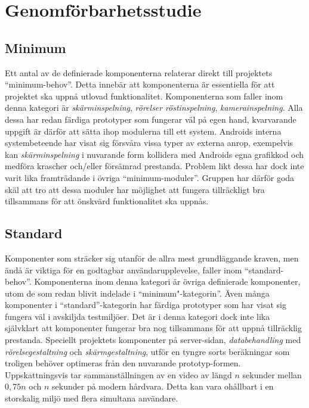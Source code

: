 \section{Genomförbarhetsstudie}

\subsection{Minimum} %
\label{sub:Minimum}

Ett antal av de definierade komponenterna relaterar direkt till projektets ``minimum-behov''. Detta innebär att komponenterna är essentiella för att projektet ska uppnå utlovad funktionalitet. Komponenterna som faller inom denna kategori är \textit{skärminspelning}, \textit{rörelser} \textit{röstinspelning}, \textit{kamerainspelning}. Alla dessa har redan färdiga prototyper som fungerar väl på egen hand, kvarvarande uppgift är därför att sätta ihop modulerna till ett system. Androids interna systembeteende har visat sig försvåra vissa typer av externa anrop, exempelvis kan \textit{skärminspelning} i nuvarande form kollidera med Androids egna grafikkod och medföra krascher och/eller försämrad prestanda. Problem likt dessa har dock inte varit lika framträdande i övriga ``minimum-moduler''. Gruppen har därför goda skäl att tro att dessa moduler har möjlighet att fungera tillräckligt bra tillsammans för att önskvärd funktionalitet ska uppnås.

\subsection{Standard} %
\label{sub:Standard}

Komponenter som sträcker sig utanför de allra mest grundläggande kraven, men ändå är viktiga för en godtagbar användarupplevelse, faller inom ``standard-behov''. Komponenterna inom denna kategori är övriga definierade komponenter, utom de som redan blivit indelade i ``minimum"-kategorin''. Även många komponenter i ``standard''-kategorin har färdiga prototyper som har visat sig fungera väl i avskiljda testmiljöer. Det är i denna kategori dock inte lika självklart att komponenter fungerar bra nog tillsammans för att uppnå tillräcklig prestanda. Speciellt projektets komponenter på server-sidan, \textit{databehandling} med \textit{rörelsegestaltning} och \textit{skärmgestaltning}, utför en tyngre sorts beräkningar som troligen behöver optimeras från den nuvarande prototyp-formen. Uppskattningsvis tar sammanställningen av en video av längd $n$ sekunder mellan $0,{}75n$ och $n$ sekunder på modern hårdvara. Detta kan vara ohållbart i en storskalig miljö med flera simultana användare.

